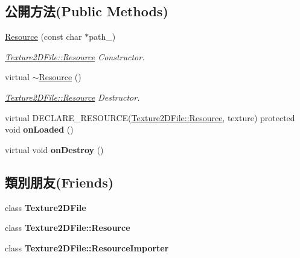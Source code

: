 \subsection*{公開方法(Public Methods)}
\begin{DoxyCompactItemize}
\item 
\hyperlink{class_magnum_1_1_texture2_d_file_1_1_resource_ae2486e3440109fbc4039090233145f7e}{Resource} (const char $\ast$path\+\_\+)
\begin{DoxyCompactList}\small\item\em \hyperlink{class_magnum_1_1_texture2_d_file_1_1_resource}{Texture2\+D\+File\+::\+Resource} Constructor. \end{DoxyCompactList}\item 
virtual \hyperlink{class_magnum_1_1_texture2_d_file_1_1_resource_ad4893c973464e2f9db32a3952e137d2b}{$\sim$\+Resource} ()
\begin{DoxyCompactList}\small\item\em \hyperlink{class_magnum_1_1_texture2_d_file_1_1_resource}{Texture2\+D\+File\+::\+Resource} Destructor. \end{DoxyCompactList}\item 
virtual D\+E\+C\+L\+A\+R\+E\+\_\+\+R\+E\+S\+O\+U\+R\+CE(\hyperlink{class_magnum_1_1_texture2_d_file_1_1_resource}{Texture2\+D\+File\+::\+Resource}, texture) protected void {\bfseries on\+Loaded} ()\hypertarget{class_magnum_1_1_texture2_d_file_1_1_resource_a1e569e356edb9f31ea6947c057216cdb}{}\label{class_magnum_1_1_texture2_d_file_1_1_resource_a1e569e356edb9f31ea6947c057216cdb}

\item 
virtual void {\bfseries on\+Destroy} ()\hypertarget{class_magnum_1_1_texture2_d_file_1_1_resource_a5524597dc7345016ed3f07db28fa6bae}{}\label{class_magnum_1_1_texture2_d_file_1_1_resource_a5524597dc7345016ed3f07db28fa6bae}

\end{DoxyCompactItemize}
\subsection*{類別朋友(Friends)}
\begin{DoxyCompactItemize}
\item 
class {\bfseries Texture2\+D\+File}\hypertarget{class_magnum_1_1_texture2_d_file_1_1_resource_a78135ffc60f8c1be32a0f49fc97f9426}{}\label{class_magnum_1_1_texture2_d_file_1_1_resource_a78135ffc60f8c1be32a0f49fc97f9426}

\item 
class {\bfseries Texture2\+D\+File\+::\+Resource}\hypertarget{class_magnum_1_1_texture2_d_file_1_1_resource_aa240389cb83e3e814688791009b71c2c}{}\label{class_magnum_1_1_texture2_d_file_1_1_resource_aa240389cb83e3e814688791009b71c2c}

\item 
class {\bfseries Texture2\+D\+File\+::\+Resource\+Importer}\hypertarget{class_magnum_1_1_texture2_d_file_1_1_resource_addc15ea48fadfdc9672288b3cb2270b9}{}\label{class_magnum_1_1_texture2_d_file_1_1_resource_addc15ea48fadfdc9672288b3cb2270b9}

\end{DoxyCompactItemize}
